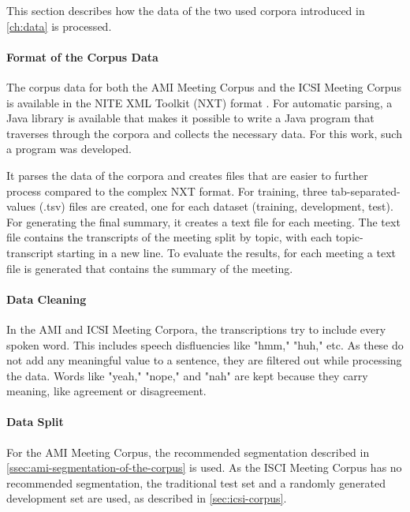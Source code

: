 This section describes how the data of the two used corpora introduced in \cref{ch:data} is processed.

\paragraph{Format of the Corpus Data}

The corpus data for both the AMI Meeting Corpus and the ICSI Meeting Corpus is available in the NITE XML Toolkit (NXT) format \cite{Carletta2003}.
For automatic parsing, a Java library is available that makes it possible to write a Java program that traverses through the corpora and collects the necessary data.
For this work, such a program was developed.

It parses the data of the corpora and creates files that are easier to further process compared to the complex NXT format.
For training, three tab-separated-values (.tsv) files are created, one for each dataset (training, development, test).
For generating the final summary, it creates a text file for each meeting.
The text file contains the transcripts of the meeting split by topic, with each topic-transcript starting in a new line.
To evaluate the results, for each meeting a text file is generated that contains the summary of the meeting.

\paragraph{Data Cleaning}

In the AMI and ICSI Meeting Corpora, the transcriptions try to include every spoken word.
This includes speech disfluencies like "hmm," "huh," etc.
As these do not add any meaningful value to a sentence, they are filtered out while processing the data.
Words like "yeah," "nope," and "nah" are kept because they carry meaning, like agreement or disagreement. 

\paragraph{Data Split}

For the AMI Meeting Corpus, the recommended segmentation described in \cref{ssec:ami-segmentation-of-the-corpus} is used.
As the ISCI Meeting Corpus has no recommended segmentation, the traditional test set and a randomly generated development set are used, as described in \cref{sec:icsi-corpus}.


